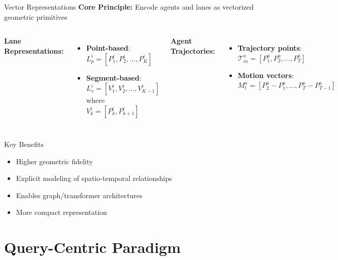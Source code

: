 \documentclass[10pt,aspectratio=169]{beamer}
\begin{document}
\begin{frame}{Vector Representations}
\textbf{Core Principle:} Encode agents and lanes as vectorized geometric primitives

\vspace{0.3cm}

\begin{columns}[T]
\textbf{Lane Representations:}
\begin{itemize}
    \item \textbf{Point-based}: $L_p^i = [P_1^i, P_2^i, \ldots, P_K^i]$~\cite{VectorNet2020, zhou2022hivt}
    \item \textbf{Segment-based}: $L_v^i = [V_1^i, V_2^i, \ldots, V_{K-1}^i]$ where $V_{k}^i = [P_k^i, P_{k+1}^i]$~\cite{liang2020learning,zhou2022hivt}
\end{itemize}

\textbf{Agent Trajectories:}
\begin{itemize}
    \item \textbf{Trajectory points}: $\mathcal{T}_{in}^a = [P_1^a, P_2^a, \ldots, P_T^a]$
    \item \textbf{Motion vectors}: $M_t^a = [P_{2}^a - P_{1}^a, \ldots, P_{T}^a - P_{T-1}^a]$~\cite{lmformerYadav2025}
\end{itemize}
\end{columns}

\vspace{0.3cm}

\begin{block}{Key Benefits~\cite{VectorNet2020, lmformerYadav2025}}
\begin{itemize}
    \item Higher geometric fidelity
    \item Explicit modeling of spatio-temporal relationships
    \item Enables graph/transformer architectures
    \item More compact representation
\end{itemize}
\end{block}
\end{frame}

\section{Query-Centric Paradigm}
\end{document}
